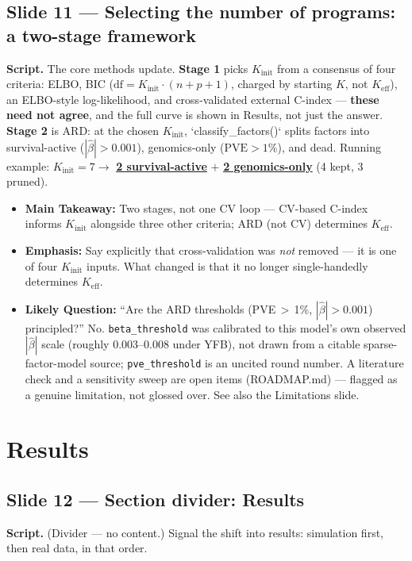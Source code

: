 \documentclass[11pt]{article}
\newcommand{\scriptlabel}{\textbf{Script. }}
\newcommand{\sectionlabel}[1]{\textbf{#1}}
\newcommand{\key}[1]{\textcolor{keyblue}{\textbf{#1}}}        %
\newcommand{\num}[1]{\textcolor{keycar}{\textbf{\uline{#1}}}} %
\begin{document}
\subsection*{Slide 11 --- Selecting the number of programs: a two-stage framework}
\scriptlabel The core methods update. \key{Stage 1} picks $K_\text{init}$ from a consensus of four
criteria: ELBO, BIC ($\text{df}=K_\text{init}\cdot(n+p+1)$, charged by starting $K$, not $K_\text{eff}$),
an ELBO-style log-likelihood, and cross-validated external C-index --- \key{these need not agree}, and
the full curve is shown in Results, not just the answer. \key{Stage 2} is ARD: at the chosen
$K_\text{init}$, `classify\_factors()` splits factors into survival-active ($|\hat\beta|>0.001$),
genomics-only ($\text{PVE}>1\%$), and dead. Running example: $K_\text{init}=7 \to$ \num{2
survival-active} $+$ \num{2 genomics-only} (4 kept, 3 pruned).

\begin{itemize}
\item \sectionlabel{Main Takeaway:} Two stages, not one CV loop --- CV-based C-index informs
$K_\text{init}$ alongside three other criteria; ARD (not CV) determines $K_\text{eff}$.
\item \sectionlabel{Emphasis:} Say explicitly that cross-validation was \emph{not} removed --- it is
one of four $K_\text{init}$ inputs. What changed is that it no longer single-handedly determines
$K_\text{eff}$.
\item \sectionlabel{Likely Question:} ``Are the ARD thresholds (PVE\,$>$\,1\%, $|\hat\beta|>0.001$)
principled?'' No. \texttt{beta\_threshold} was calibrated to this model's own observed
$|\hat\beta|$ scale (roughly 0.003--0.008 under YFB), not drawn from a citable sparse-factor-model
source; \texttt{pve\_threshold} is an uncited round number. A literature check and a sensitivity
sweep are open items (ROADMAP.md) --- flagged as a genuine limitation, not glossed over. See also the
Limitations slide.
\end{itemize}

\section*{Results}

\subsection*{Slide 12 --- Section divider: Results}
\scriptlabel (Divider --- no content.) Signal the shift into results: simulation first, then real
data, in that order.
\end{document}
